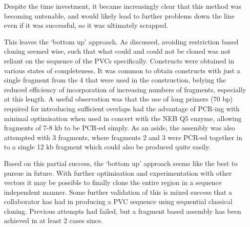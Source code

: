 Despite the time investment, it became increasingly clear that this method was becoming untenable, and would likely lead to further problems down the line even if it was successful, so it was ultimately scrapped.

This leaves the `bottom up' approach. As discussed, avoiding restriction based cloning seemed wise, such that what could and could not be cloned was not reliant on the sequence of the PVCs specifically. Constructs were obtained in various states of completeness. It was common to obtain constructs with just a single fragment from the 4 that were used in the construction, belying the reduced efficiency of incorporation of increasing numbers of fragments, especially at this length. A useful observation was that the use of long primers (70 bp) required for introducing sufficient overlaps had the advantage of PCR-ing with minimal optimisation when used in concert with the NEB Q5 enzyme, allowing fragments of 7-8 kb to be PCR-ed simply. As an aside, the assembly was also attempted with 3 fragments, where fragments 2 and 3 were PCR-ed together in to a single 12 kb fragment which could also be produced quite easily.

Based on this partial success, the `bottom up' approach seems like the best to pursue in future. With further optimisation and experimentation with other vectors it may be possible to finally clone the entire region in a sequence independent manner. Some further validation of this is mixed success that a collaborator has had in producing a PVC sequence using sequential classical cloning. Previous attempts had failed, but a fragment based assembly has been achieved in at least 2 cases since.


